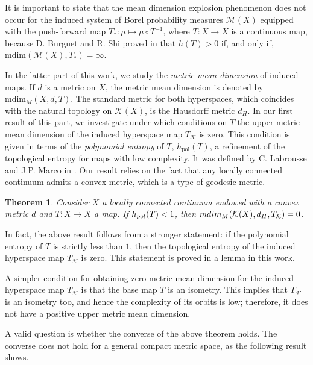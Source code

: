 \documentclass[sn-mathphys-num]{sn-jnl}%
\theoremstyle{thmstyleone}%
\newtheorem{theorem}{Theorem}%
\theoremstyle{thmstyletwo}%
\theoremstyle{thmstylethree}%
\newcommand*\induce[1]{#1_\mathcal{K}}
\newcommand*\hyp[1]{\mathcal{#1}}
\begin{document}
It is important to state that the mean dimension explosion phenomenon does not occur for the induced system of Borel probability measures $\hyp{M}(X)$ equipped with the push-forward map $T_*: \mu \mapsto \mu\circ T^{-1}$, where $T: X \to X$ is a continuous map, because D. Burguet and R. Shi proved in \cite{burguet_shi_2022} that $h(T) > 0$ if, and only if, $\text{mdim}(\hyp{M}(X), T_*) = \infty$. 

In the latter part of this work, we study the \emph{metric mean dimension} of induced maps. If $d$ is a metric on $X$, the metric mean dimension is denoted by $\text{mdim}_M(X, d, T)$. The standard metric for both hyperspaces, which coincides with the natural topology on $\hyp{K}(X)$, is the Hausdorff metric $d_H$. In our first result of this part, we investigate under which conditions on $T$ the upper metric mean dimension of the induced hyperspace map $\induce{T}$ is zero. This condition is given in terms of the \emph{polynomial entropy} of $T$, $h_{\text{pol}}(T)$, a refinement of the topological entropy for maps with low complexity. It was defined by C. Labrousse and J.P. Marco in \cite{labrousse_marco_2014}. Our result relies on the fact that any locally connected continuum admits a convex metric, which is a type of geodesic metric.\\

\begin{theorem}\label{thm:poly-entropy-less1-metric-mean-dim-zero}
    Consider $X$ a locally connected continuum endowed with a convex metric $d$ and $T: X \to X$ a map. If $h_{\emph{pol}}(T) < 1$, then $\emph{mdim}_M(\hyp{K}(X), d_H, \induce{T}) = 0$.\\
\end{theorem}

In fact, the above result follows from a stronger statement: if the polynomial entropy of $T$ is strictly less than $1$, then the topological entropy of the induced hyperspace map $\induce{T}$ is zero. This statement is proved in a lemma in this work.

A simpler condition for obtaining zero metric mean dimension for the induced hyperspace map $\induce{T}$ is that the base map $T$ is an isometry. This implies that $\induce{T}$ is an isometry too, and hence the complexity of its orbits is low; therefore, it does not have a positive upper metric mean dimension.

A valid question is whether the converse of the above theorem holds. The converse does not hold for a general compact metric space, as the following result shows.\\
\end{document}
